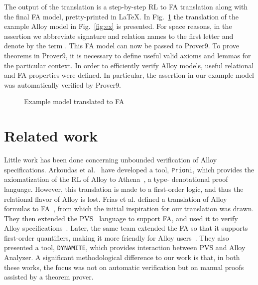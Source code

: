 \documentclass{llncs}
\begin{document}
The output of the translation is a step-by-step RL to FA translation
along with the final FA model, pretty-printed in \LaTeX. In
Fig.~\ref{fig:exfa} the translation of the example Alloy model in
Fig.~\ref{fig:ex} is presented. For space reasons, in the assertion we
abbreviate signature and relation names to the first letter and denote
by  the term . This FA model can now
be passed to Prover9. To prove theorems in Prover9, it is necessary to
define useful valid axioms and lemmas for the particular
context. In order to efficiently verify Alloy models, useful
relational and FA properties were defined. In particular, the
assertion in our example model was automatically verified by Prover9.

\begin{figure}[t]
  \centering
  

 \caption{Example model translated to FA}
  \label{fig:exfa}
\end{figure}

\section{Related work}
\label{sec:related}

Little work has been done concerning unbounded verification of Alloy
specifications. Arkoudas et al.~\cite{prioni} have developed a tool,
\texttt{Prioni}, which provides the axiomatization of the RL of Alloy
to Athena~\cite{athena}, a type- denotational proof
language. However, this translation is made to a first-order logic,
and thus the relational flavor of Alloy is lost. Frias et al. defined
a translation of Alloy formulas to FA~\cite{eqalloy}, from which the
initial inspiration for our translation was drawn. They then extended
the PVS~\cite{pvs} language to support FA, and used it to verify Alloy
specifications~\cite{friasall2}. Later, the same team extended the FA
so that it supports first-order quantifiers, making it more friendly
for Alloy users~\cite{dynamite}. They also presented a tool,
\texttt{DYNAMITE}, which provides interaction between PVS and Alloy
Analyzer. A significant methodological difference to our work is that,
in both these works, the focus was not on automatic verification but on
manual proofs assisted by a theorem prover.
\end{document}
